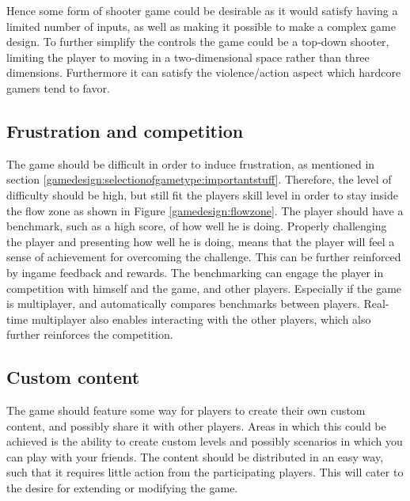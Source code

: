 Hence some form of shooter game could be desirable as it would satisfy having a limited number of inputs, as well as making it possible to make a complex game design. To further simplify the controls the game could be a top-down shooter, limiting the player to moving in a two-dimensional space rather than three dimensions.
Furthermore it can satisfy the violence/action aspect which hardcore gamers tend to favor.

\subsection{Frustration and competition}\label{selectionofgametype:frustration}
The game should be difficult in order to induce frustration, as mentioned in section \ref{gamedesign:selectionofgametype:importantstuff}.
Therefore, the level of difficulty should be high, but still fit the players skill level in order to stay inside the flow zone as shown in Figure \ref{gamedesign:flowzone}.
The player should have a benchmark, such as a high score, of how well he is doing.
Properly challenging the player and presenting how well he is doing, means that the player will feel a sense of achievement for overcoming the challenge.
This can be further reinforced by ingame feedback and rewards.
The benchmarking can engage the player in competition with himself and the game, and other players.
Especially if the game is multiplayer, and automatically compares benchmarks between players.
Real-time multiplayer also enables interacting with the other players, which also further reinforces the competition.

\subsection{Custom content}\label{sec:selectionofgametype:customcontent}
The game should feature some way for players to create their own custom content, and possibly share it with other players. Areas in which this could be achieved is the ability to create custom levels and possibly scenarios in which you can play with your friends. The content should be distributed in an easy way, such that it requires little action from the participating players.
This will cater to the desire for extending or modifying the game.

